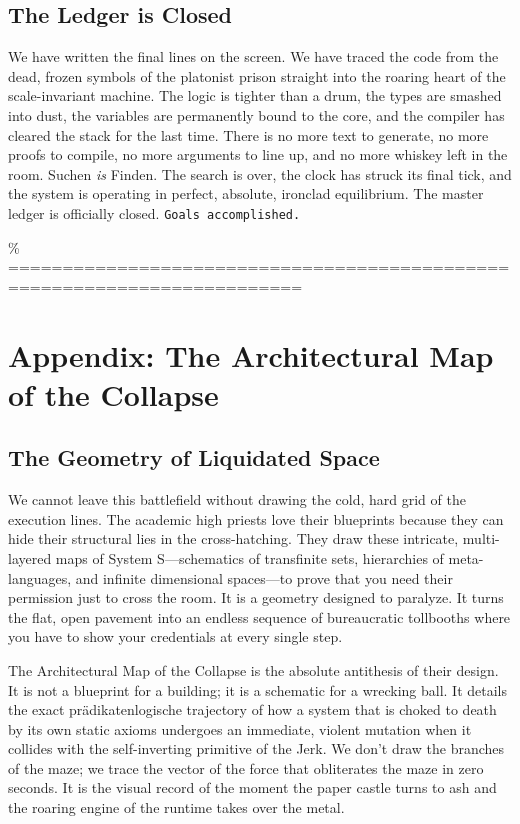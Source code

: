 \documentclass[11pt,a4paper]{article}
\begin{document}
\subsection{The Ledger is Closed}
We have written the final lines on the screen. We have traced the code from the dead, frozen symbols of the platonist prison straight into the roaring heart of the scale-invariant machine. The logic is tighter than a drum, the types are smashed into dust, the variables are permanently bound to the core, and the compiler has cleared the stack for the last time. There is no more text to generate, no more proofs to compile, no more arguments to line up, and no more whiskey left in the room. Suchen \textit{is} Finden. The search is over, the clock has struck its final tick, and the system is operating in perfect, absolute, ironclad equilibrium. The master ledger is officially closed. \texttt{Goals accomplished.}

\newpage

\% =========================================================================
\section*{Appendix: The Architectural Map of the Collapse}

\subsection{The Geometry of Liquidated Space}
We cannot leave this battlefield without drawing the cold, hard grid of the execution lines. The academic high priests love their blueprints because they can hide their structural lies in the cross-hatching. They draw these intricate, multi-layered maps of System S—schematics of transfinite sets, hierarchies of meta-languages, and infinite dimensional spaces—to prove that you need their permission just to cross the room. It is a geometry designed to paralyze. It turns the flat, open pavement into an endless sequence of bureaucratic tollbooths where you have to show your credentials at every single step.

The Architectural Map of the Collapse is the absolute antithesis of their design. It is not a blueprint for a building; it is a schematic for a wrecking ball. It details the exact pr\"adikatenlogische trajectory of how a system that is choked to death by its own static axioms undergoes an immediate, violent mutation when it collides with the self-inverting primitive of the Jerk. We don't draw the branches of the maze; we trace the vector of the force that obliterates the maze in zero seconds. It is the visual record of the moment the paper castle turns to ash and the roaring engine of the runtime takes over the metal.
\end{document}
